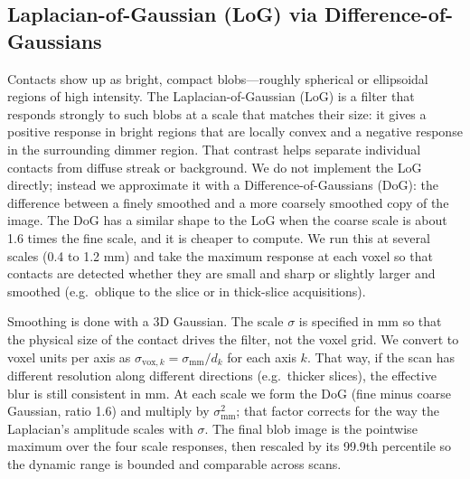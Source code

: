 \documentclass[11pt,a4paper]{article}
\begin{document}
\subsection{Laplacian-of-Gaussian (LoG) via Difference-of-Gaussians}
Contacts show up as bright, compact blobs---roughly spherical or ellipsoidal regions of high intensity. The Laplacian-of-Gaussian (LoG) is a filter that responds strongly to such blobs at a scale that matches their size: it gives a positive response in bright regions that are locally convex and a negative response in the surrounding dimmer region. That contrast helps separate individual contacts from diffuse streak or background. We do not implement the LoG directly; instead we approximate it with a Difference-of-Gaussians (DoG): the difference between a finely smoothed and a more coarsely smoothed copy of the image. The DoG has a similar shape to the LoG when the coarse scale is about 1.6 times the fine scale, and it is cheaper to compute. We run this at several scales (0.4 to 1.2 mm) and take the maximum response at each voxel so that contacts are detected whether they are small and sharp or slightly larger and smoothed (e.g.\ oblique to the slice or in thick-slice acquisitions).

Smoothing is done with a 3D Gaussian. The scale \(\sigma\) is specified in mm so that the physical size of the contact drives the filter, not the voxel grid. We convert to voxel units per axis as \(\sigma_{\mathrm{vox},k} = \sigma_{\mathrm{mm}} / d_k\) for each axis \(k\). That way, if the scan has different resolution along different directions (e.g.\ thicker slices), the effective blur is still consistent in mm. At each scale we form the DoG (fine minus coarse Gaussian, ratio 1.6) and multiply by \(\sigma_{\mathrm{mm}}^2\); that factor corrects for the way the Laplacian's amplitude scales with \(\sigma\). The final blob image is the pointwise maximum over the four scale responses, then rescaled by its 99.9th percentile so the dynamic range is bounded and comparable across scans.
\end{document}
